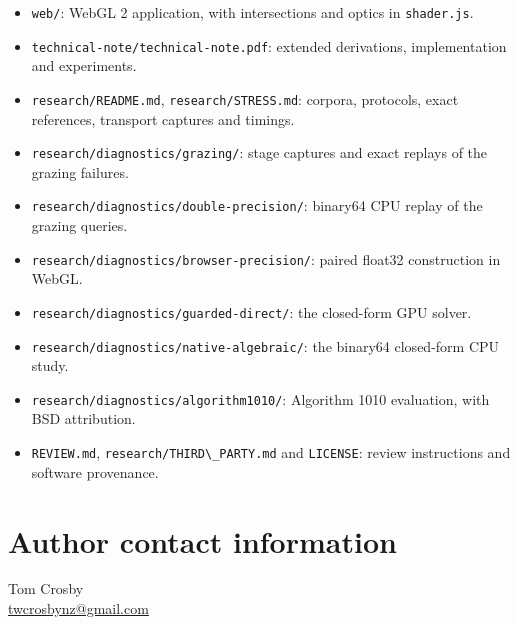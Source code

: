 \documentclass{jcgt}
\providecommand{\passthrough}[1]{#1}
\providecommand{\tightlist}{\setlength{\itemsep}{0pt}\setlength{\parskip}{0pt}}
\begin{document}
\begin{itemize}
\tightlist
\item
  \passthrough{\lstinline!web/!}: WebGL 2 application, with
  intersections and optics in \passthrough{\lstinline!shader.js!}.
\item
  \passthrough{\lstinline!technical-note/technical-note.pdf!}: extended
  derivations, implementation and experiments.
\item
  \passthrough{\lstinline!research/README.md!},
  \passthrough{\lstinline!research/STRESS.md!}: corpora, protocols,
  exact references, transport captures and timings.
\item
  \passthrough{\lstinline!research/diagnostics/grazing/!}: stage
  captures and exact replays of the grazing failures.
\item
  \passthrough{\lstinline!research/diagnostics/double-precision/!}:
  binary64 CPU replay of the grazing queries.
\item
  \passthrough{\lstinline!research/diagnostics/browser-precision/!}:
  paired float32 construction in WebGL.
\item
  \passthrough{\lstinline!research/diagnostics/guarded-direct/!}: the
  closed-form GPU solver.
\item
  \passthrough{\lstinline!research/diagnostics/native-algebraic/!}: the
  binary64 closed-form CPU study.
\item
  \passthrough{\lstinline!research/diagnostics/algorithm1010/!}:
  Algorithm 1010 evaluation, with BSD attribution.
\item
  \passthrough{\lstinline!REVIEW.md!},
  \passthrough{\lstinline!research/THIRD\_PARTY.md!} and
  \passthrough{\lstinline!LICENSE!}: review instructions and software
  provenance.
\end{itemize}

\section*{Author contact information}
Tom Crosby\\
\href{mailto:twcrosbynz@gmail.com}{twcrosbynz@gmail.com}
\end{document}
